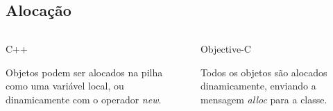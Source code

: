 \documentclass[brazil]{beamer}
\begin{document}
\subsection{Alocação}

\begin{frame}[fragile]
  \begin{columns}
    \begin{column}{.5\textwidth}
        \begin{center}
            C++
        \end{center}
        Objetos podem ser alocados na pilha como uma variável local, ou dinamicamente com o operador \textit{new}.
    \end{column}
    \begin{column}{.5\textwidth}
        \begin{center}
            Objective-C
        \end{center}
        Todos os objetos são alocados dinamicamente, enviando a mensagem \textit{alloc} para a classe.
    \end{column}
  \end{columns}
\end{frame}
\end{document}
